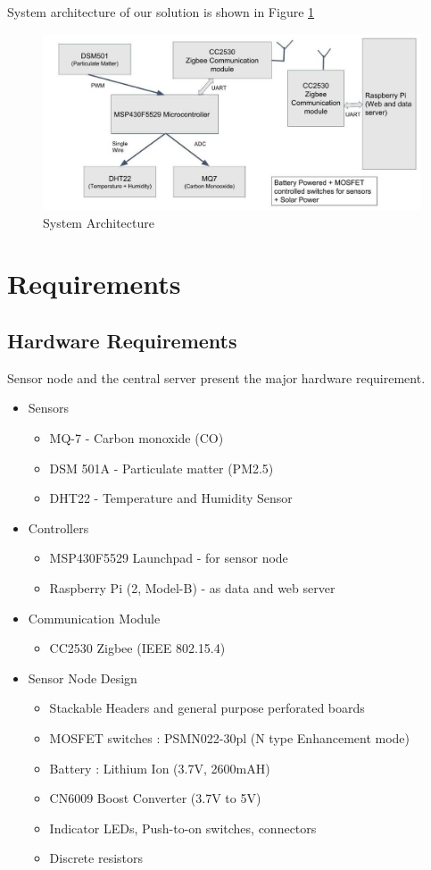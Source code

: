 \documentclass[a4paper,12pt]{article}
\begin{document}
System architecture of our solution is shown in Figure \ref{fig:sys_arch} 
\begin{figure}[!ht]
	\centering
	\includegraphics[scale=0.5]{system_archi1.jpg}
	\caption{System Architecture}
	\label{fig:sys_arch}
\end{figure}

\section{Requirements}
\subsection{Hardware Requirements}
Sensor node and the central server present the major hardware requirement.
\begin{itemize}
\item Sensors
\begin{itemize}
\item MQ-7 - Carbon monoxide (CO) \cite{co_datasheet}
\item DSM 501A - Particulate matter (PM2.5) \cite{dsm_datasheet}
\item DHT22 - Temperature and Humidity Sensor \cite{dht22_datasheet}
\end{itemize}
\item Controllers
\begin{itemize}
\item MSP430F5529 Launchpad - for sensor node
\item Raspberry Pi (2, Model-B) - as data and web server
\end{itemize}
\item Communication Module
\begin{itemize}
\item CC2530 Zigbee (IEEE 802.15.4)
\end{itemize}
\item Sensor Node Design
\begin{itemize}
\item Stackable Headers and general purpose perforated boards
\item MOSFET switches : PSMN022-30pl (N type Enhancement mode)
\item Battery : Lithium Ion (3.7V, 2600mAH)
\item CN6009 Boost Converter (3.7V to 5V)
\item Indicator LEDs, Push-to-on switches, connectors
\item Discrete resistors

\end{itemize}
\end{itemize}
\end{document}
